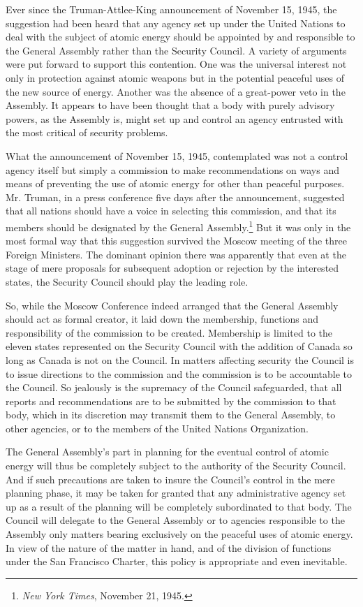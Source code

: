 Ever since the Truman-Attlee-King announcement of November 15, 1945, the suggestion had been heard that any agency set up under the United Nations to deal with the subject of atomic energy should be appointed by and responsible to the General Assembly rather than the Security Council. A variety of arguments were put forward to support this contention. One was the universal interest not only in protection against atomic weapons but in the potential peaceful uses of the new source of energy. Another was the absence of a great-power veto in the Assembly. It appears to have been thought that a body with purely advisory powers, as the Assembly is, might set up and control an agency entrusted with the most critical of security problems.

What the announcement of November 15, 1945, contemplated was not a control agency itself but simply a commission to make recommendations on ways and means of preventing the use of atomic energy for other than peaceful purposes. Mr. Truman, in a press conference five days after the announcement, suggested that all nations should have a voice in selecting this commission, and that its members should be designated by the General Assembly.\footnote{\textit{New York Times}, November 21, 1945.} But it was only in the most formal way that this suggestion survived the Moscow meeting of the three Foreign Ministers. The dominant opinion there was apparently that even at the stage of mere proposals for subsequent adoption or rejection by the interested states, the Security Council should play the leading role.

So, while the Moscow Conference indeed arranged that the General Assembly should act as formal creator, it laid down the membership, functions and responsibility of the commission to be created. Membership is limited to the eleven states represented on the Security Council with the addition of Canada so long as Canada is not on the Council. In matters affecting security the Council is to issue directions to the commission and the commission is to be accountable to the Council. So jealously is the supremacy of the Council safeguarded, that all reports and recommendations are to be submitted by the commission to that body, which in its discretion may transmit them to the General Assembly, to other agencies, or to the members of the United Nations Organization.

The General Assembly's part in planning for the eventual control of atomic energy will thus be completely subject to the authority of the Security Council. And if such precautions are taken to insure the Council's control in the mere planning phase, it may be taken for granted that any administrative agency set up as a result of the planning will be completely subordinated to that body. The Council will delegate to the General Assembly or to agencies responsible to the Assembly only matters bearing exclusively on the peaceful uses of atomic energy. In view of the nature of the matter in hand, and of the division of functions under the San Francisco Charter, this policy is appropriate and even inevitable.

